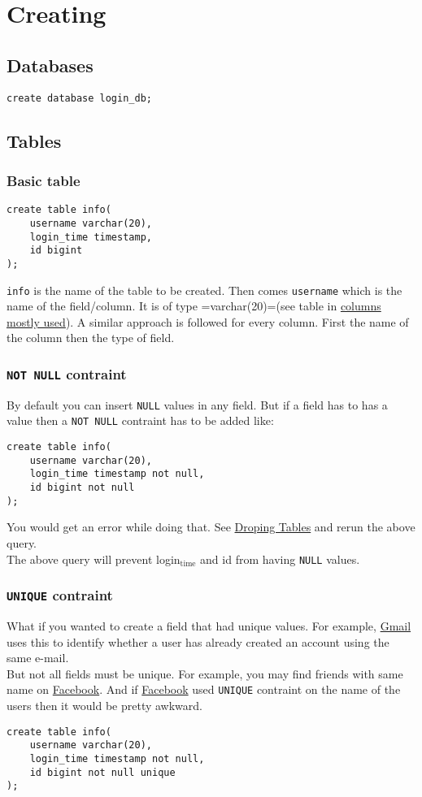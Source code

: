 \documentclass[11pt]{article}
\begin{document}
\section{Creating}
\label{sec:orgheadline16}
\subsection{Databases}
\label{sec:orgheadline11}
\begin{verbatim}
create database login_db;
\end{verbatim}
\subsection{Tables}
\label{sec:orgheadline13}
\subsubsection{Basic table}
\label{sec:orgheadline12}
\begin{verbatim}
create table info(
	username varchar(20),
	login_time timestamp,
	id bigint
);
\end{verbatim}
\texttt{info} is the name of the table to be created. Then
comes \texttt{username} which is the name of the field/column.
It is of type =varchar(20)=(see table in \hyperref[sec:orgheadline7]{columns mostly used}).
A similar approach is followed for every column. First
the name of the column then the type of field.
\subsubsection{\texttt{NOT NULL} contraint}
\label{sec:orgheadline14}
By default you can insert \texttt{NULL} values in any
field. But if a field has to has a value then
a \texttt{NOT NULL} contraint has to be added like:
\begin{verbatim}
create table info(
    username varchar(20),
    login_time timestamp not null,
    id bigint not null
);
\end{verbatim}
You would get an error while doing that. See
\hyperref[sec:orgheadline13]{Droping Tables} and rerun the above query.\\
The above query will prevent login\(_{\text{time}}\) and id
from having \texttt{NULL} values.
\subsubsection{\texttt{UNIQUE} contraint}
\label{sec:orgheadline15}
What if you wanted to create a field that had
unique values. For example, \href{https://mail.google.com}{Gmail} uses this to
identify whether a user has already created an
account using the same e-mail.\\
But not all fields must be unique. For example,
you may find friends with same name on \href{https://www.facebook.com}{Facebook}.
And if \href{https://www.facebook.com}{Facebook} used \texttt{UNIQUE} contraint on the
name of the users then it would be pretty awkward.
\begin{verbatim}
create table info(
	username varchar(20),
	login_time timestamp not null,
	id bigint not null unique
);
\end{verbatim}
\end{document}
